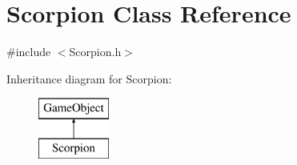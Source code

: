 \hypertarget{class_scorpion}{}\section{Scorpion Class Reference}
\label{class_scorpion}


{\ttfamily \#include $<$Scorpion.\+h$>$}

Inheritance diagram for Scorpion\+:\begin{figure}[H]
\begin{center}
\leavevmode
\includegraphics[height=2.000000cm]{class_scorpion}
\end{center}
\end{figure}
